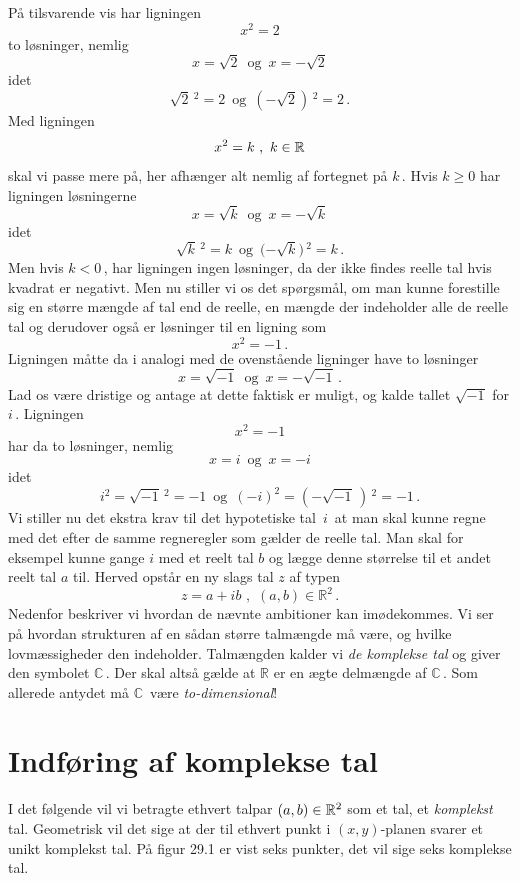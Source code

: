 På tilsvarende vis har ligningen
$$x^2=2$$
 to løsninger, nemlig
$$x=\sqrt 2\,\,\,\mathrm{og}\,\,\,x=-\sqrt 2$$
idet
$$\sqrt 2\,^2=2\,\,\,\mathrm{og}\,\,\,{(-\sqrt 2)}\,^2=2\,.$$
Med ligningen 
$$x^2=k\,\,,\,\,k\in\mathbb{R}$$
skal vi passe mere på, her afhænger alt nemlig af fortegnet på $k\,$. Hvis $k\geq 0$ har ligningen løsningerne 
$$x=\sqrt k\,\,\,\mathrm{og}\,\,\,x=-\sqrt k$$
idet
$$\sqrt k\,^2=k\,\,\,\mathrm{og}\,\,\,{(-\sqrt k})\,^2=k\,.$$
Men hvis $k<0\,$, har ligningen ingen løsninger, da der ikke findes reelle tal hvis kvadrat er negativt. \bs 
Men nu stiller vi os det spørgsmål, om man kunne forestille sig en større mængde af tal end de reelle, en mængde der indeholder alle de reelle tal og derudover også er løsninger til en ligning som 
$$x^2=-1\,.$$
Ligningen måtte da i analogi med de ovenstående ligninger have to løsninger
$$x=\sqrt{-1} \,\,\,\mathrm{og}\,\,\,x=-\sqrt{-1}\,.$$
Lad os være dristige og antage at dette faktisk er muligt, og kalde tallet $\sqrt{-1}$ for $i\,$. Ligningen
$$x^2=-1$$
har da to løsninger, nemlig
$$x=i\,\,\,\mathrm{og}\,\,\,x=-i$$
idet
$$i^2={\sqrt{-1}}\,^2=-1\,\,\,\mathrm{og}\,\,\,(-i)^2={(-\sqrt{-1}\,)}\,^2=-1\,.$$
Vi stiller nu det ekstra krav til det hypotetiske tal $\,i\,$ at man skal kunne regne med det efter de samme regneregler som gælder de reelle tal. Man skal for eksempel kunne gange $i$ med et reelt tal $b$ og lægge denne størrelse til et andet reelt tal $a$ til. Herved opstår en ny slags tal $z$ af typen 
$$z=a+ib\,\,,\,\,(a,b)\in \mathbb R^2\,.$$
Nedenfor beskriver vi hvordan de nævnte ambitioner kan imødekommes. Vi ser på hvordan strukturen af en sådan større talmængde må være, og hvilke lovmæssigheder den indeholder. Talmængden kalder vi \textit{de komplekse tal} og giver den symbolet $\mathbb C\,$. Der skal altså gælde at $\mathbb R$ er en ægte delmængde af $\mathbb C\,$. Som allerede antydet må $\mathbb C\,$ være \textit{to-dimensional}!

\section{Indføring af komplekse tal}

I det følgende vil vi betragte ethvert talpar $(a,b)\in \mathbb{R}^2$ som et tal, et \textit{komplekst} tal. Geometrisk vil det sige at der til ethvert punkt i $(x,y)$-planen svarer et unikt komplekst tal. På figur 29.1 er vist seks punkter, det vil sige seks komplekse tal. 

